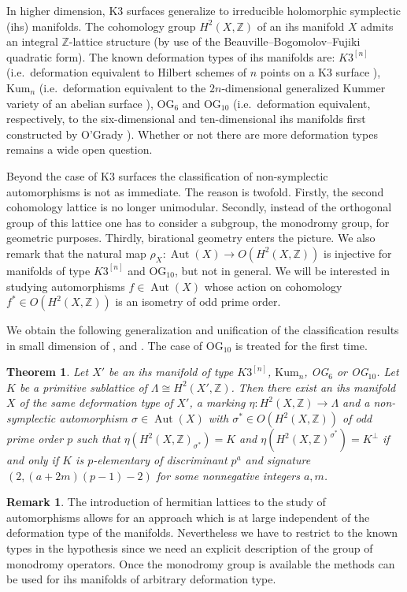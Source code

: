 \documentclass{amsart}
\theoremstyle{definition}
\newtheorem{remark}[definition]{Remark}
\theoremstyle{plain}
\newtheorem{theorem}[definition]{Theorem}
\DeclareMathOperator{\aut}{Aut}
\newcommand{\ZZ}{\mathbb{Z}}
\newcommand{\IZ}{\mathbb{Z}}
\newcommand{\kumn}{\mathrm{Kum}_n}
\newcommand{\hskn}{K3^{\left[n\right]}}
\begin{document}
In higher dimension, K3 surfaces generalize to irreducible holomorphic symplectic (ihs) manifolds. The cohomology group $H^2(X,\IZ)$ of an ihs manifold $X$ admits an integral $\ZZ$-lattice structure (by use of the Beauville--Bogomolov--Fujiki quadratic form).
The known deformation types of ihs manifolds are: $\hskn$ (i.e.\ deformation equivalent to Hilbert schemes of $n$ points on a K3 surface \cite[\S 6]{beauville}), $\kumn$ (i.e.\ deformation equivalent to the $2n$-dimensional generalized Kummer variety of an abelian surface \cite[\S 7]{beauville}), OG$_6$ and OG$_{10}$ (i.e.\ deformation equivalent, respectively, to the six-dimensional and ten-dimensional ihs manifolds first constructed by O'Grady \cite{ogrady6, ogrady10}). Whether or not there are more deformation types remains a wide open question.

Beyond the case of K3 surfaces the classification of non-symplectic automorphisms is not as immediate. The reason is twofold. Firstly, the second cohomology lattice is no longer unimodular. Secondly, instead of the orthogonal group of this lattice one has to consider a subgroup, the monodromy group, for geometric purposes.
Thirdly, birational geometry enters the picture.
We also remark that the natural map $\rho_X \colon \aut(X) \rightarrow O(H^2(X,\IZ))$ is injective for manifolds of type $\hskn$ and OG$_{10}$, but not in general. We will be interested in studying automorphisms $f \in \aut(X)$ whose action on cohomology $f^* \in O(H^2(X,\IZ))$ is an isometry of odd prime order.

We obtain the following generalization and unification of the classification results in small dimension of \cite{CC}, \cite{mongardi_tari_wandel:kummer} and \cite{grossi:nonsymplectic}. The case of OG$_10$ is treated for the first time.
\begin{theorem} \label{thm: classification k3n}
Let $X'$ be an ihs manifold of type $\hskn$, $\kumn$, OG$_6$ or OG$_{10}$.
Let $K$ be a primitive sublattice of $\Lambda\cong H^2(X',\ZZ)$. Then there exist an ihs manifold $X$ of the same deformation type of $X'$, a marking $\eta: H^2(X,\IZ) \rightarrow \Lambda$ and a non-symplectic automorphism $\sigma \in \aut(X)$ with $\sigma^* \in O(H^2(X,\IZ))$ of odd prime order $p$ such that $\eta(H^2(X,\IZ)_{\sigma^*}) = K$ and $\eta(H^2(X,\IZ)^{\sigma^*}) = K^\perp$ if and only if $K$ is $p$-elementary of discriminant $p^a$ and signature $(2, (a+2m)(p-1)-2)$ for some nonnegative integers $a, m$.
\end{theorem}
\begin{remark}
 The introduction of hermitian lattices to the study of automorphisms
 allows for an approach which is at large independent of the deformation type of the manifolds.
 Nevertheless we have to restrict to the known types in the hypothesis since we need an explicit description of the group of monodromy operators.
 Once the monodromy group is available the methods can be used for ihs manifolds of arbitrary deformation type.
\end{remark}
\end{document}
